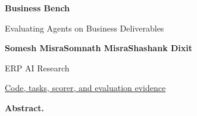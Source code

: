\documentclass[10pt,a4paper]{article}
\begin{document}
\thispagestyle{firstpage}
\begin{center}
{\fontsize{26}{29}\selectfont\bfseries Business Bench\par}
\vspace{5pt}
{\fontsize{17}{21}\selectfont Evaluating Agents on Business Deliverables\par}
\vspace{11pt}
{\bfseries Somesh Misra\quad Somnath Misra\quad Shashank Dixit}\par
\vspace{2pt}
{\small\color{muted}ERP AI Research}\par
\vspace{3pt}
\href{https://github.com/erphq/business-bench}{\small Code, tasks, scorer, and evaluation evidence}
\end{center}
\vspace{4pt}
\begin{tcolorbox}[colback=wash,colframe=wash,boxrule=0pt,arc=0pt,left=10pt,right=10pt,top=8pt,bottom=8pt]
\small\textbf{Abstract.}\enspace
\end{tcolorbox}


\end{document}
